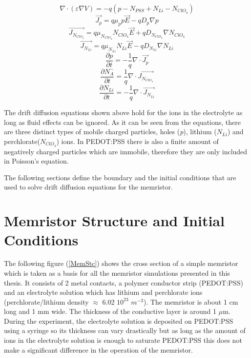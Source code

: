\begin{doublespace}
\begin{equation}
\nabla \cdot  (\varepsilon \nabla V)=-q( p-N_{PSS}+ N_{Li} - N_{ClO_{4}})
\end{equation}
\begin{equation}
\vec{J_p}=q\mu_p p \vec{E}-q D_p \nabla p
\end{equation}
\begin{equation}
\vec{J_{N_{ClO_{4}}}}=q\mu_{N_{ClO_{4}}} N_{ClO_{4}} \vec{E}+q D_{N_{ClO_{4}}} \nabla N_{ClO_{4}}
\end{equation}
\begin{equation}
\vec{J_{N_{Li}}}=q\mu_{N_{Li}} N_{Li} \vec{E}-q D_{N_{Li}} \nabla N_{Li}
\end{equation}
\begin{equation}
\frac{\partial p}{\partial t}=-\frac{1}{q}\nabla \cdot \vec{J_p}
\end{equation}
\begin{equation}
\frac{\partial N_{A}^{-}}{\partial t}=\frac{1}{q}\nabla \cdot \vec{J_{N_{ClO_{4}}}}
\end{equation}
\begin{equation}
\frac{\partial N_{Li}}{\partial t}=-\frac{1}{q}\nabla \cdot \vec{J_{N_{Li}}}
\end{equation}

The drift diffusion equations shown above hold for the ions in the electrolyte as long as fluid effects can be ignored. As it can be seen from the equations, there are three distinct types of mobile charged particles, holes (\textit{p}), lithium ($N_{Li}$) and perchlorate($N_{ClO_{4}}$) ions. In PEDOT:PSS there is also a finite amount of negatively charged particles which are immobile, therefore they are only included in Poisson's equation.

The following sections define the boundary and the initial conditions that are used to solve drift diffusion equations for the memristor.

\section{Memristor Structure and Initial Conditions}

The following figure (\ref{MemStc}) shows the cross section of a simple memristor which is taken as a basis for all the memristor simulations presented in this thesis. It consists of 2 metal contacts, a polymer conductor strip (PEDOT:PSS) and an electrolyte solution which has lithium and perchlorate ions (perchlorate/lithium density $\approx$ 6.02 $10^{23}$ $m^{-3}$). The memristor is about 1 cm long and 1 mm wide. The thickness of the conductive layer is around 1 $\mu$m. During the experiment, the electrolyte solution is deposited on PEDOT:PSS using a syringe so its thickness can vary drastically but as long as the amount of ions in the electrolyte solution is enough to saturate PEDOT:PSS this does not make a significant difference in the operation of the memristor.


\end{doublespace}
